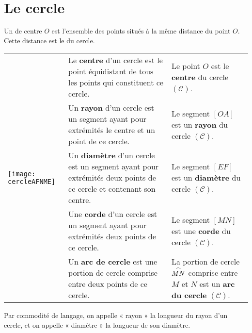 
\newpage



\section{Le cercle}

\begin{definition}
Un \textbf{} de centre $O$ est l'ensemble des points situés à la même distance du point $O$. 
Cette distance est le \textbf{} du cercle.
\end{definition}

\begin{aconnaitre}
\begin{tabularx}{.95\linewidth}{|X|p{5cm}|p{3cm}|}
\hline
\multirow{5}{*}{\texttt{[image: cercleAFNME]}}  & Le \textcolor{C2}{\textbf{centre}} d'un cercle est le point équidistant de tous les points qui constituent ce cercle. & Le point $O$ est le \textcolor{C2}{\textbf{centre}} du cercle $(\mathcal{C})$.\\ \cline{2-3}
 & Un \textcolor{J1}{\textbf{rayon}} d'un cercle est un segment ayant pour extrémités le centre et un point de ce cercle. & Le segment $[OA]$ est un  \textcolor{J1}{\textbf{rayon}} du cercle $(\mathcal{C})$.\\ \cline{2-3}
  & Un  \textcolor{H1}{\textbf{diamètre}} d'un cercle est un segment ayant pour extrémités deux points de ce cercle et contenant son centre. & Le segment $[EF]$ est un  \textcolor{H1}{\textbf{diamètre}} du cercle $(\mathcal{C})$.\\ \cline{2-3}
 & Une  \textcolor{PartieFonction}{\textbf{corde}} d'un cercle est un segment ayant pour extrémités deux points de ce cercle. & Le segment $[MN]$ est une  \textcolor{PartieFonction}{\textbf{corde}} du cercle $(\mathcal{C})$.\\ \cline{2-3}
 & Un  \textcolor{B2}{\textbf{arc de cercle}} est une portion de cercle comprise entre deux points de ce cercle. & La portion de cercle $\overset{\huge{\frown}}{MN}$ comprise entre $M$ et $N$ est un  \textcolor{B2}{\textbf{arc du cercle}} $(\mathcal{C})$.\\ \hline
  \end{tabularx}
 \end{aconnaitre}
  
  
 \begin{remarque}
 Par commodité de langage, on appelle « rayon » la longueur du rayon d'un cercle, et  on appelle « diamètre » la longueur de son diamètre.
  \end{remarque}
  

